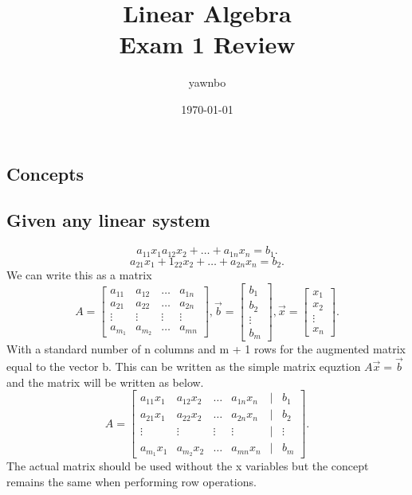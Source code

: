 \documentclass{report}
\title{\Huge{Linear Algebra}\\ Exam 1 Review }
\author{\huge{yawnbo}}
\date{\today}
\begin{document}
\maketitle
\begin{multicols}{2}
\chapter{Concepts}
\section{Given any linear system}%
\label{sec: Given any linear system }

\[
a_{ 11 }x_1 a_{ 12 }x_2 + \ldots + a_{ 1n }x_n = b_1
.\] 
\[
a_{ 21 }x_1+1_{ 22 }x_2+\ldots+a_{ 2n }x_n=b_2
.\] 
We can write this as a matrix 
\[
	A = \begin{bmatrix} a_{ 11 } & a_{ 12 } & \ldots & a_{ 1n } \\ a_{ 21 } & a_{ 22 } & \ldots & a_{ 2n } \\ \vdots &  \vdots & \vdots & \vdots \\ a_{ m_1 } & a_{ m_2 } & \ldots & a_{ mn }\end{bmatrix}, \vec{ b } = \begin{bmatrix} b_1 \\ b_2 \\ \vdots \\ b_m \end{bmatrix} , \vec{ x } = \begin{bmatrix} x_1 \\ x_2 \\ \vdots \\ x_n \end{bmatrix} 
.\] 
With a standard number of n columns and m + 1 rows for the augmented matrix equal to the vector b. This can be written as the simple matrix equztion $ A \vec{ x } = \vec{ b } $ and the matrix will be written as below. 
\[
	A = \begin{bmatrix} a_{ 11 }x_1 & a_{ 12 }x_2 & \ldots & a_{ 1n }x_n & \bigg| & b_1 \\ a_{ 21 }x_1 & a_{ 22 }x_2 & \ldots & a_{ 2n }x_n & \bigg| & b_2 \\ \vdots &  \vdots & \vdots & \vdots & \bigg| & \vdots \\ a_{ m_1 }x_1 & a_{ m_2 }x_2 & \ldots & a_{ mn }x_n & \bigg| & b_m \end{bmatrix}
.\] 
The actual matrix should be used without the x variables but the concept remains the same when performing row operations.


\end{multicols}
\end{document}
